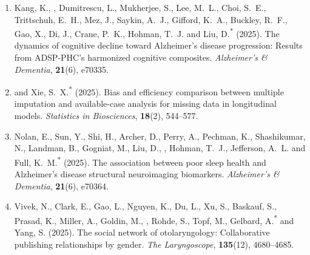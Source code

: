 \begin{enumerate}[resume=journalpubs]
\begin{pubentry}
\par\end{pubentry}
\item\begin{pubentry} Kang, K., \PZnot{}, Dumitrescu, L., Mukherjee, S., Lee, M.\ L., Choi, S.\ E., Trittschuh, E.\ H., Mez, J., Saykin, A.\ J., Gifford, K.\ A., Buckley, R.\ F., Gao, X., Di, J., Crane, P.\ K., Hohman, T.\ J. and Liu, D.\textsuperscript{*} (2025). The dynamics of cognitive decline toward Alzheimer's disease progression: Results from ADSP-PHC's harmonized cognitive composites. \emph{Alzheimer's \& Dementia}, \textbf{21}(6), e70335.
  

\par\end{pubentry}
\item\begin{pubentry} \PZnot{} and Xie, S.\ X.\textsuperscript{*} (2025). Bias and efficiency comparison between multiple imputation and available-case analysis for missing data in longitudinal models. \emph{Statistics in Biosciences}, \textbf{18}(2), 544--577.

\par\end{pubentry}
\item\begin{pubentry} Nolan, E., Sun, Y., Shi, H., Archer, D., Perry, A., Pechman, K., Shashikumar, N., Landman, B., Gogniat, M., Liu, D., \PZnot{}, Hohman, T.\ J., Jefferson, A.\ L. and Full, K.\ M.\textsuperscript{*} (2025). The association between poor sleep health and Alzheimer's disease structural neuroimaging biomarkers. \emph{Alzheimer's \& Dementia}, \textbf{21}(6), e70364.

\par\end{pubentry}
\item\begin{pubentry} Vivek, N., Clark, E., Gao, L., Nguyen, K., Du, L., Xu, S., Baskauf, S., Prasad, K., Miller, A., Goldin, M., \PZnot{}, Rohde, S., Topf, M., Gelbard, A.\textsuperscript{*} and Yang, S. (2025). The social network of otolaryngology: Collaborative publishing relationships by gender. \emph{The Laryngoscope}, \textbf{135}(12), 4680--4685.


\end{pubentry}
\end{enumerate}
